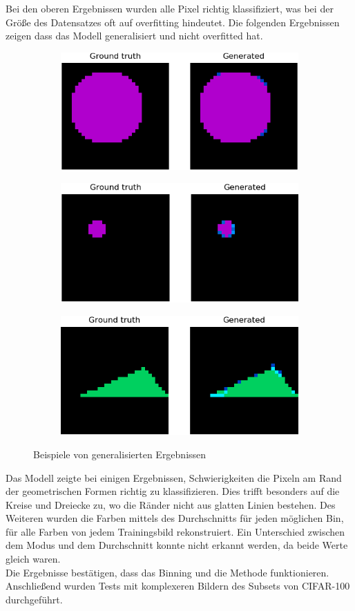 Bei den oberen Ergebnissen wurden alle Pixel richtig klassifiziert, was bei der Größe des Datensatzes oft auf \gls{overfitting} hindeutet.
Die folgenden Ergebnissen zeigen dass das Modell generalisiert und nicht overfitted hat.

\begin{figure}[H]
  \vspace{1cm}
  \begin{subfigure}
    \centering
    \includegraphics[width=.32\textwidth]{resources/experiments/581.png}
  \end{subfigure}
  \begin{subfigure}
    \centering
    \includegraphics[width=.32\textwidth]{resources/experiments/712.png}
  \end{subfigure}
  \begin{subfigure}
    \centering
    \includegraphics[width=.32\textwidth]{resources/experiments/761.png}
  \end{subfigure}
  \caption{Beispiele von generalisierten Ergebnissen}
  \label{image:nicht-gute-ergebnisse-toy-dataset}
\end{figure}

Das Modell zeigte bei einigen Ergebnissen, Schwierigkeiten die Pixeln am Rand der geometrischen Formen richtig zu klassifizieren.
Dies trifft besonders auf die Kreise und Dreiecke zu, wo die Ränder nicht aus glatten Linien bestehen. Des Weiteren wurden die Farben mittels
des Durchschnitts für jeden möglichen Bin, für alle Farben von jedem Trainingsbild rekonstruiert. Ein Unterschied zwischen dem Modus und dem
Durchschnitt konnte nicht erkannt werden, da beide Werte gleich waren.
\\
Die Ergebnisse bestätigen, dass das Binning und die Methode funktionieren. Anschließend wurden Tests mit komplexeren Bildern
des Subsets von CIFAR-100 durchgeführt.

